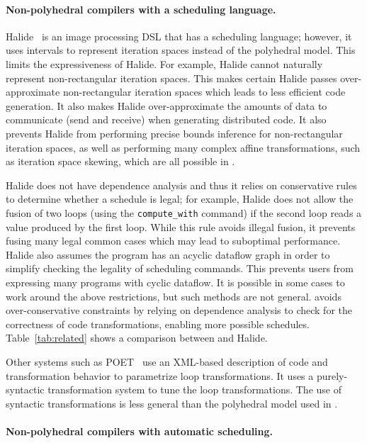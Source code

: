 \paragraph{Non-polyhedral compilers with a scheduling language.}
Halide~\cite{halide_12} is an image processing DSL that has a scheduling language; however, it uses intervals to represent iteration spaces instead of the polyhedral model.  This limits the expressiveness of Halide.
For example, Halide cannot naturally represent non-rectangular iteration spaces.  This makes certain Halide passes over-approximate non-rectangular iteration spaces which leads to less efficient code generation.  It also makes Halide over-approximate the amounts of data to communicate (send and receive) when generating distributed code.  It also prevents Halide from performing precise bounds inference for non-rectangular iteration spaces, as well as performing many complex affine transformations, such as iteration space skewing, which are all possible in \framework{}.

Halide does not have dependence analysis and thus it relies on conservative rules to determine whether a schedule is legal; for example, Halide does not allow the fusion of two loops (using the \texttt{compute\_with} command) if the second loop reads a value produced by the first loop.
While this rule avoids illegal fusion, it prevents fusing many legal common cases which may lead to suboptimal performance.
Halide also assumes the program has an acyclic dataflow graph in order to simplify checking the legality of scheduling commands. This prevents users from expressing many programs with cyclic dataflow.
It is possible in some cases to work around the above restrictions, but such methods are not general.
\framework{} avoids over-conservative constraints by relying on dependence analysis to check for the correctness of code transformations, enabling more possible schedules.  Table~\ref{tab:related} shows a comparison between \framework{} and Halide.

Other systems such as POET~\cite{Yi:2007ay} use an XML-based description of code and transformation behavior to parametrize loop transformations.  It uses a purely-syntactic transformation system to tune the loop transformations.  The use of syntactic transformations is less general than the polyhedral model used in \framework.

\paragraph{Non-polyhedral compilers with automatic scheduling.}

